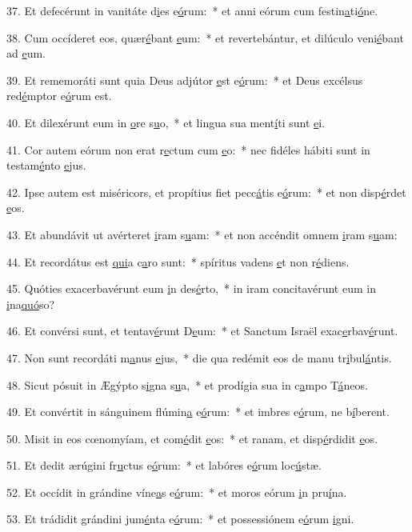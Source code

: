 37. Et defecérunt in vanitáte d\uline{i}es e\uline{ó}rum:~* et anni eórum cum festin\uline{a}ti\uline{ó}ne.\par 
38. Cum occíderet eos, quær\uline{é}bant \uline{e}um:~* et revertebántur, et dilúculo veni\uline{é}bant ad \uline{e}um.\par 
39. Et rememoráti sunt quia Deus adjútor \uline{e}st e\uline{ó}rum:~* et Deus excélsus red\uline{é}mptor e\uline{ó}rum est.\par 
40. Et dilexérunt eum in \uline{o}re s\uline{u}o,~* et lingua sua ment\uline{í}ti sunt \uline{e}i.\par 
41. Cor autem eórum non erat r\uline{e}ctum cum \uline{e}o:~* nec fidéles hábiti sunt in testam\uline{é}nto \uline{e}jus.\par 
42. Ipse autem est miséricors, et propítius fiet pecc\uline{á}tis e\uline{ó}rum:~* et non disp\uline{é}rdet \uline{e}os.\par 
43. Et abundávit ut avérteret \uline{i}ram s\uline{u}am:~* et non accéndit omnem \uline{i}ram s\uline{u}am:\par 
44. Et recordátus est \uline{qui}a c\uline{a}ro sunt:~* spíritus vadens \uline{e}t non r\uline{é}diens.\par 
45. Quóties exacerbavérunt eum \uline{i}n des\uline{é}rto,~* in iram concitavérunt eum in \uline{i}na\uline{quó}so?\par 
46. Et convérsi sunt, et tentav\uline{é}runt D\uline{e}um:~* et Sanctum Israël exac\uline{e}rbav\uline{é}runt.\par 
47. Non sunt recordáti m\uline{a}nus \uline{e}jus,~* die qua redémit eos de manu tr\uline{i}bul\uline{á}ntis.\par 
48. Sicut pósuit in Ægýpto s\uline{i}gna s\uline{u}a,~* et prodígia sua in c\uline{a}mpo T\uline{á}neos.\par 
49. Et convértit in sánguinem flúmin\uline{a} e\uline{ó}rum:~* et imbres e\uline{ó}rum, ne b\uline{í}berent.\par 
50. Misit in eos cœnomyíam, et com\uline{é}dit \uline{e}os:~* et ranam, et disp\uline{é}rdidit \uline{e}os.\par 
51. Et dedit ærúgini fr\uline{u}ctus e\uline{ó}rum:~* et labóres e\uline{ó}rum loc\uline{ú}stæ.\par 
52. Et occídit in grándine víne\uline{a}s e\uline{ó}rum:~* et moros eórum \uline{i}n pru\uline{í}na.\par 
53. Et trádidit grándini jum\uline{é}nta e\uline{ó}rum:~* et possessiónem e\uline{ó}rum \uline{i}gni.\par 

